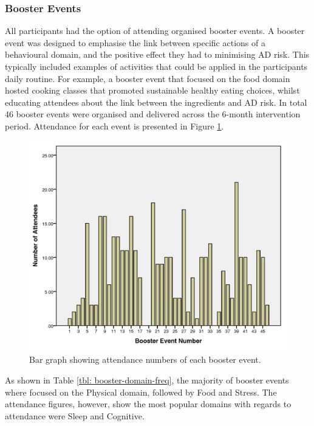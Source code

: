 \subsubsection{Booster Events}
All participants had the option of attending organised booster events. A booster event was designed to emphasise the link between specific actions of a behavioural domain, and the positive effect they had to minimising AD risk. This typically included examples of activities that could be applied in the participants daily routine. For example, a booster event that focused on the food domain hosted cooking classes that promoted sustainable healthy eating choices, whilst educating attendees about the link between the ingredients and AD risk. In total 46 booster events were organised and delivered across the 6-month intervention period. Attendance for each event is presented in Figure \ref{fig: booster-attendance}.

\begin{figure}[h]
    \centering
    \includegraphics[scale=0.5, angle=0]{Files/prevention-study-3/figures/booster-attendance.png}
    \caption{Bar graph showing attendance numbers of each booster event.}
    \label{fig: booster-attendance}
\end{figure}

As shown in Table \ref{tbl: booster-domain-freq}, the majority of booster events where focused on the Physical domain, followed by Food and Stress. The attendance figures, however, show the most popular domains with regards to attendance were Sleep and Cognitive.


